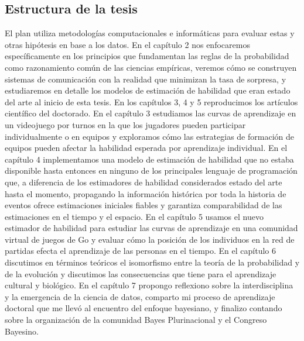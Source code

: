 \documentclass[a4paper,11pt]{book}
\theoremstyle{definition}
\begin{document}
\subsection{Estructura de la tesis}

El plan utiliza metodologías computacionales e informáticas para evaluar estas y otras hipótesis en base a los datos.
%
En el capítulo 2 nos enfocaremos específicamente en los principios que fundamentan las reglas de la probabilidad como razonamiento común de las ciencias empíricas, veremos cómo se construyen sistemas de comunicación con la realidad que minimizan la tasa de sorpresa, y estudiaremos en detalle los modelos de estimación de habilidad que eran estado del arte al inicio de esta tesis.
%
En los capítulos 3, 4 y 5 reproducimos los artículos científico del doctorado.
%
En el capítulo 3 estudiamos las curvas de aprendizaje en un videojuego por turnos en la que los jugadores pueden participar individualmente o en equipos y exploramos cómo las estrategias de formación de equipos pueden afectar la habilidad esperada por aprendizaje individual.
%
En el capítulo 4 implementamos una modelo de estimación de habilidad que no estaba disponible hasta entonces en ninguno de los principales lenguaje de programación que, a diferencia de los estimadores de habilidad considerados estado del arte hasta el momento, propagando la información histórica por toda la historia de eventos ofrece estimaciones iniciales fiables y garantiza comparabilidad de las estimaciones en el tiempo y el espacio.
%
En el capítulo 5 usamos el nuevo estimador de habilidad para estudiar las curvas de aprendizaje en una comunidad virtual de juegos de Go y evaluar cómo la posición de los individuos en la red de partidas efecta el aprendizaje de las personas en el tiempo.
%
En el capítulo 6 discutimos en términos teóricos el isomorfismo entre la teoría de la probabilidad y de la evolución y discutimos las consecuencias que tiene para el aprendizaje cultural y biológico.
%
En el capítulo 7 propongo reflexiono sobre la interdisciplina y la emergencia de la ciencia de datos, comparto mi proceso de aprendizaje doctoral que me llevó al encuentro del enfoque bayesiano, y finalizo contando sobre la organización de la comunidad Bayes Plurinacional y el Congreso Bayesino.
\end{document}
